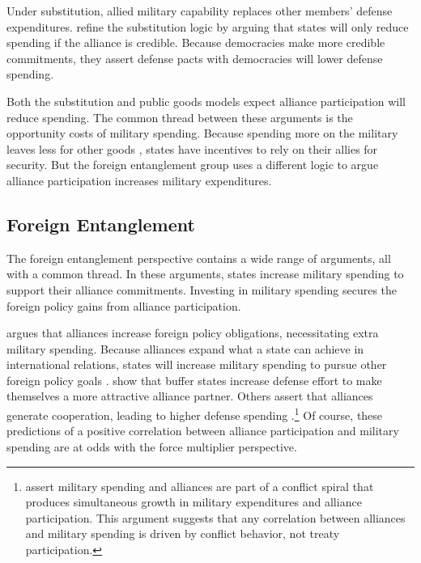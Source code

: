 \documentclass[12pt]{article}
\begin{document}
Under substitution, allied military capability replaces other members' defense expenditures. 
\citet{DigiuseppePoast2016} refine the substitution logic by arguing that states will only reduce spending if the alliance is credible. 
Because democracies make more credible commitments, they assert defense pacts with democracies will lower defense spending.


Both the substitution and public goods models expect alliance participation will reduce spending. 
The common thread between these arguments is the opportunity costs of military spending. 
Because spending more on the military leaves less for other goods \citep{Fordham1998}, states have incentives to rely on their allies for security. 
But the foreign entanglement group uses a different logic to argue alliance participation increases military expenditures. 


\subsection{Foreign Entanglement}


The foreign entanglement perspective contains a wide range of arguments, all with a common thread. 
In these arguments, states increase military spending to support their alliance commitments. 
Investing in military spending secures the foreign policy gains from alliance participation. 


\citet{Diehl1994} argues that alliances increase foreign policy obligations, necessitating extra military spending. 
Because alliances expand what a state can achieve in international relations, states will increase military spending to pursue other foreign policy goals \citep{MorganPalmer2006}. 
\citet{Horowitzetal2017} show that buffer states increase defense effort to make themselves a more attractive alliance partner. 
Others assert that alliances generate cooperation, leading to higher defense spending \citep{Palmer1990, QuirozFlores2011}.\footnote{
\citet{SeneseVasquez2008} assert military spending and alliances are part of a conflict spiral that produces simultaneous growth in military expenditures and alliance participation. 
This argument suggests that any correlation between alliances and military spending is driven by conflict behavior, not treaty participation.
}
Of course, these predictions of a positive correlation between alliance participation and military spending are at odds with the force multiplier perspective. 
\end{document}
